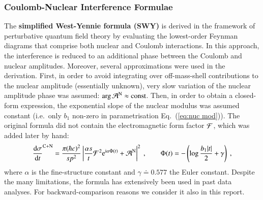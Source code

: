 \subsubsection{Coulomb-Nuclear Interference Formulae}
\label{sec:cni interference}

The {\bf simplified West-Yennie formula (SWY)} \cite{wy68} is derived in the framework of perturbative quantum field theory by evaluating the lowest-order Feynman diagrams that comprise both nuclear and Coulomb interactions. In this approach, the interference is reduced to an additional phase between the Coulomb and nuclear amplitudes. Moreover, several approximations were used in the derivation. First, in order to avoid integrating over off-mass-shell contributions to the nuclear amplitude (essentially unknown), very slow variation of the nuclear amplitude phase was assumed: $\arg {\cal A}^{\rm N} \approx \hbox{const}$. Then, in order to obtain a closed-form expression, the exponential slope of the nuclear modulus was assumed constant (i.e.~only $b_1$ non-zero in parametrisation Eq.~(\ref{eq:nuc mod})). The original formula did not contain the electromagnetic form factor ${\cal F}$, which was added later by hand:
\begin{equation}
\label{eq:int swy}
	{\d\sigma\over \d t}^{\rm C+N} = {\pi (\hbar c)^2 \over s p^2} \left | {\alpha s\over t} {\cal F}^2 \e^{\I\alpha \Phi(t)} + {\cal A}^{\rm N} \right |^2\ ,\qquad
	\Phi(t) = - \left( \log {b_1 |t|\over 2} + \gamma \right)\ ,
\end{equation}
where $\alpha$ is the fine-structure constant and $\gamma \doteq 0.577$ the Euler constant. Despite the many limitations, the formula has extensively been used in past data analyses. For backward-comparison reasons we consider it also in this report.

